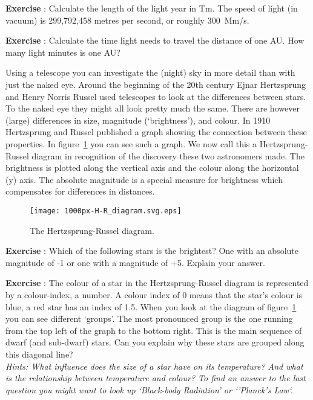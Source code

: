 \begin{shaded}
\textbf{Exercise \theExercise {}} : Calculate the length of the light year in Tm. The speed of light (in vacuum) is 299,792,458 metres per second, or roughly 300~Mm/s.\end{shaded}
\begin{shaded}
\textbf{Exercise \theExercise {}} : Calculate the time light needs to travel the distance of one AU. How many light minutes is one AU?\end{shaded}

Using a telescope you can investigate the (night) sky in more detail than with just the naked eye. Around the beginning of the 20th century Ejnar Hertzsprung and Henry Norris Russel used telescopes to look at the differences between stars. To the naked eye they might all look pretty much the same. There are however (large) differences in size, magnitude (`brightness'), and colour. In 1910 Hertzsprung and Russel published a graph showing the connection between these properties. In figure~\ref{fig:hertzsprung} you can see such a graph. We now call this a Hertzsprung-Russel diagram in recognition of the discovery these two astronomers made. The brightness is plotted along the vertical axis and the colour along the horizontal (y) axis. The absolute magnitude is a special measure for brightness which compensates for differences in distances.
\begin{figure}\begin{center}
\texttt{[image: 1000px-H-R\_diagram.svg.eps]}%
\caption{The Hertzsprung-Russel diagram.}\label{fig:hertzsprung}
\end{center}\end{figure}

\begin{shaded}
\textbf{Exercise \theExercise {}} : Which of the following stars is the brightest? One with an absolute magnitude of -1 or one with a magnitude of +5. Explain your answer.\end{shaded}
\begin{shaded}
\textbf{Exercise \theExercise {}} : The colour of a star in the Hertzsprung-Russel diagram is represented by a colour-index, a number. A colour index of 0 means that the star's colour is blue, a red star has an index of 1.5. When you look at the diagram of figure~\ref{fig:hertzsprung} you can see different `groups'. The most pronounced group is the one running from the top left of the graph to the bottom right. This is the main sequence of dwarf (and sub-dwarf) stars. Can you explain why these stars are grouped along this diagonal line?\\ \textit{Hints: What influence does the size of a star have on its temperature? And what is the relationship between temperature and colour? To find an answer to the last question you might want to look up `Black-body Radiation' or `'Planck's Law`.}\end{shaded}

